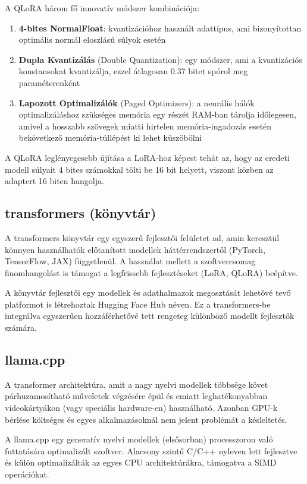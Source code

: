 A QLoRA három fő innovatív módszer kombinációja:
\begin{enumerate}
	\item \textbf{4-bites NormalFloat}: kvantizációhoz használt adattípus, ami bizonyítottan optimális normál eloszlású súlyok esetén
	\item \textbf{Dupla Kvantizálás} (Double Quantization): egy módszer, ami a kvantizációs konstansokat kvantizálja, ezzel átlagosan 0.37 bitet spórol meg paraméterenként
	\item \textbf{Lapozott Optimalizálók} (Paged Optimizers): a neurális hálók optimalizáláshoz szükséges memória egy részét RAM-ban tárolja időlegesen, amivel a hosszabb szövegek miatti hirtelen memória-ingadozás esetén bekövetkező memória-túllépést ki lehet küszöbölni
\end{enumerate}

A QLoRA leglényegesebb újítása a LoRA-hoz képest tehát az, hogy az eredeti modell súlyait 4 bites számokkal tölti be 16 bit helyett, viszont közben az adaptert 16 biten hangolja.

\subsection{transformers (könyvtár)}

A transformers könyvtár \cite{transformers} egy egyszerű fejlesztői felületet ad, amin keresztül könnyen használhatók előtanított modellek háttérrendszertől (PyTorch, TensorFlow, JAX) függetlenül. A használat mellett a szoftvercsomag finomhangolást is támogat a legfrissebb fejlesztéseket (LoRA, QLoRA) beépítve. 

A könyvtár fejlesztői egy modellek és adathalmazok megosztását lehetővé tevő platformot is létrehoztak Hugging Face Hub néven. Ez a transformers-be integrálva egyszerűen hozzáférhetővé tett rengeteg különböző modellt fejlesztők számára.

\subsection{llama.cpp}

A transformer architektúra, amit a nagy nyelvi modellek többsége követ párhuzamosítható műveletek végzésére épül és emiatt leghatékonyabban videokártyákon (vagy speciális hardware-en) használható. Azonban GPU-k bérlése költséges és egyes alkalmazásoknál nem jelent problémát a késleltetés.

A llama.cpp egy generatív nyelvi modellek (elsősorban) processzoron való futtatására optimalizált szoftver. Alacsony szintű C/C++ nyleven lett fejlesztve és külön optimalizálták az egyes CPU architektúrákra, támogatva a SIMD operációkat.

